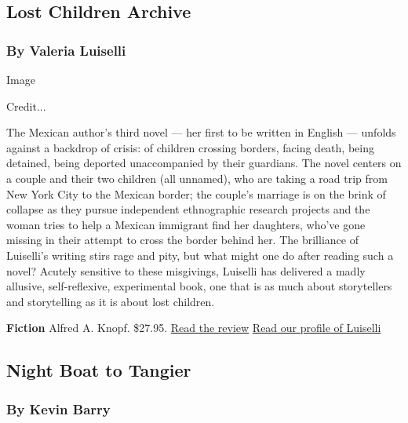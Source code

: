 \hypertarget{lost-children-archive}{%
\subsection{Lost Children Archive}\label{lost-children-archive}}

\hypertarget{by-valeria-luiselli}{%
\subsubsection{By Valeria Luiselli}\label{by-valeria-luiselli}}

Image

Credit...

The Mexican author's third novel --- her first to be written in English
--- unfolds against a backdrop of crisis: of children crossing borders,
facing death, being detained, being deported unaccompanied by their
guardians. The novel centers on a couple and their two children (all
unnamed), who are taking a road trip from New York City to the Mexican
border; the couple's marriage is on the brink of collapse as they pursue
independent ethnographic research projects and the woman tries to help a
Mexican immigrant find her daughters, who've gone missing in their
attempt to cross the border behind her. The brilliance of Luiselli's
writing stirs rage and pity, but what might one do after reading such a
novel? Acutely sensitive to these misgivings, Luiselli has delivered a
madly allusive, self-reflexive, experimental book, one that is as much
about storytellers and storytelling as it is about lost children.

\textbf{Fiction} \textbar{} Alfred A. Knopf. \$27.95. \textbar{}
\href{https://www.nytimes3xbfgragh.onion/2019/03/06/books/review/lost-children-archive-valeria-luiselli.html}{Read
the review} \textbar{}
\href{https://www.nytimes3xbfgragh.onion/2019/02/07/arts/valeria-luiselli-lost-children-archive.html}{Read
our profile of Luiselli}

\hypertarget{night-boat-to-tangier}{%
\subsection{Night Boat to Tangier}\label{night-boat-to-tangier}}

\hypertarget{by-kevin-barry}{%
\subsubsection{By Kevin Barry}\label{by-kevin-barry}}

